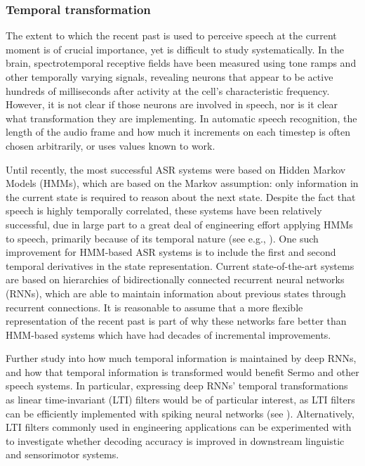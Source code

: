 \subsubsection{Temporal transformation}

The extent to which the recent past
is used to perceive speech
at the current moment
is of crucial importance,
yet is difficult to study systematically.
In the brain, spectrotemporal receptive fields
have been measured using
tone ramps and other temporally varying signals,
revealing neurons that appear to be active
hundreds of milliseconds
after activity at
the cell's characteristic frequency.
However, it is not clear if those
neurons are involved in speech,
nor is it clear what transformation they are implementing.
In automatic speech recognition,
the length of the audio frame
and how much it increments on each timestep
is often chosen arbitrarily,
or uses values known to work.

Until recently,
the most successful ASR systems
were based on Hidden Markov Models (HMMs),
which are based on the Markov assumption:
only information in the current state
is required to reason about the next state.
Despite the fact that speech
is highly temporally correlated,
these systems have been relatively successful,
due in large part to
a great deal of engineering effort
applying HMMs to speech,
primarily because of its temporal nature
(see e.g., \citealt{bahl1983,rabiner1989,lee1989}).
One such improvement for HMM-based ASR systems
is to include the first and second temporal derivatives
in the state representation.
Current state-of-the-art systems
are based on hierarchies of bidirectionally connected
recurrent neural networks (RNNs),
which are able to maintain information about
previous states through recurrent connections.
It is reasonable to assume that
a more flexible representation
of the recent past
is part of why these networks
fare better than HMM-based systems
which have had decades of incremental improvements.

Further study into how much temporal information
is maintained by deep RNNs,
and how that temporal information is transformed
would benefit Sermo
and other speech systems.
In particular, expressing deep RNNs'
temporal transformations as
linear time-invariant (LTI) filters
would be of particular interest,
as LTI filters can be efficiently implemented
with spiking neural networks
(see \citealt{eliasmith2004}).
Alternatively, LTI filters
commonly used in engineering applications
can be experimented with
to investigate whether decoding accuracy
is improved in downstream
linguistic and sensorimotor systems.


